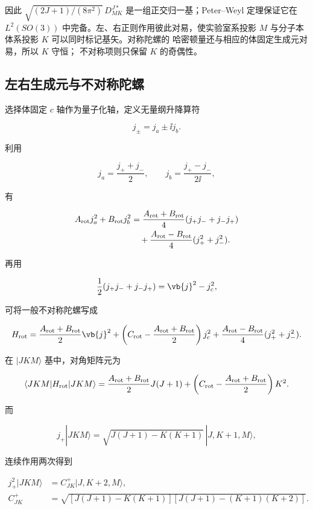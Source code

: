 因此
\(\sqrt{(2J+1)/(8\pi^2)}\,D^{J*}_{MK}\)
是一组正交归一基；Peter--Weyl 定理保证它在
\(L^2(SO(3))\) 中完备。左、右正则作用彼此对易，使实验室系投影
\(M\) 与分子本体系投影 \(K\) 可以同时标记基矢。对称陀螺的
哈密顿量还与相应的体固定生成元对易，所以 \(K\) 守恒；
不对称项则只保留 \(K\) 的奇偶性。

\subsection{左右生成元与不对称陀螺}
选择体固定 \(c\) 轴作为量子化轴，定义无量纲升降算符

\[
j_\pm=j_a\pm\ii j_b.
\]

利用

\[
j_a=\frac{j_++j_-}{2},
\qquad
j_b=\frac{j_+-j_-}{2\ii},
\]

有

\begin{align*}
A_{\rm rot}j_a^2+B_{\rm rot}j_b^2
&=\frac{A_{\rm rot}+B_{\rm rot}}{4}
(j_+j_-+j_-j_+)\\
&\quad+\frac{A_{\rm rot}-B_{\rm rot}}{4}
(j_+^2+j_-^2).
\end{align*}

再用

\[
\frac12(j_+j_-+j_-j_+)=\vb{j}^2-j_c^2,
\]

可将一般不对称陀螺写成

\begin{equation}
H_{\rm rot}
=\frac{A_{\rm rot}+B_{\rm rot}}{2}\vb{j}^2
+\left(C_{\rm rot}-\frac{A_{\rm rot}+B_{\rm rot}}2\right)j_c^2
+\frac{A_{\rm rot}-B_{\rm rot}}4(j_+^2+j_-^2).
\label{eq:asymmetric-top-k-mixing}
\end{equation}

在 \(|JKM\rangle\) 基中，对角矩阵元为

\begin{equation}
\langle JKM|H_{\rm rot}|JKM\rangle
=\frac{A_{\rm rot}+B_{\rm rot}}2J(J+1)
+\left(C_{\rm rot}-\frac{A_{\rm rot}+B_{\rm rot}}2\right)K^2.
\label{eq:asymmetric-top-diagonal-element}
\end{equation}

而

\[
j_+|JKM\rangle
=\sqrt{J(J+1)-K(K+1)}\,|J,K+1,M\rangle,
\]

连续作用两次得到

\begin{align*}
j_+^2|JKM\rangle
&=C^+_{JK}|J,K+2,M\rangle,\\
C^+_{JK}
&=\sqrt{[J(J+1)-K(K+1)]
[J(J+1)-(K+1)(K+2)]}.
\end{align*}

